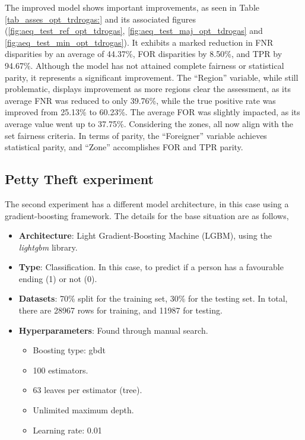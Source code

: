 \documentclass[fleqn,10pt]{wlscirep}
\begin{document}
The improved model shows important improvements, as seen in Table \ref{tab_asses_opt_trdrogas:} and its associated figures (\ref{fig:aeq_test_ref_opt_tdrogas}, \ref{fig:aeq_test_maj_opt_tdrogas} and \ref{fig:aeq_test_min_opt_tdrogas}). It exhibits a marked reduction in FNR disparities by an average of 44.37\%, FOR disparities by 8.50\%, and TPR by 94.67\%. Although the model has not attained complete fairness or statistical parity, it represents a significant improvement. The ``Region'' variable, while still problematic, displays improvement as more regions clear the assessment, as its average FNR was reduced to only 39.76\%, while the true positive rate was improved from 25.13\% to 60.23\%. The average FOR was slightly impacted, as its average value went up to 37.75\%. Considering the zones, all now align with the set fairness criteria. In terms of parity, the ``Foreigner'' variable achieves statistical parity, and ``Zone'' accomplishes FOR and TPR parity.

\clearpage
\subsection{Petty Theft experiment}

The second experiment has a different model architecture, in this case using a gradient-boosting framework. The details for the base situation are as follows,

\begin{itemize}
    \item \textbf{Architecture}: Light Gradient-Boosting Machine (LGBM), using the \textit{lightgbm} library.
    \item \textbf{Type}: Classification. In this case, to predict if a person has a favourable ending (1) or not (0).
    \item \textbf{Datasets}: 70\% split for the training set, 30\% for the testing set. In total, there are 28967 rows for training, and 11987 for testing.
    \item \textbf{Hyperparameters}: Found through manual search.
        \begin{itemize}
            \item Boosting type: gbdt
            \item 100 estimators.
            \item 63 leaves per estimator (tree).
            \item Unlimited maximum depth.
            \item Learning rate: 0.01
        \end{itemize}
\end{itemize}
\end{document}
